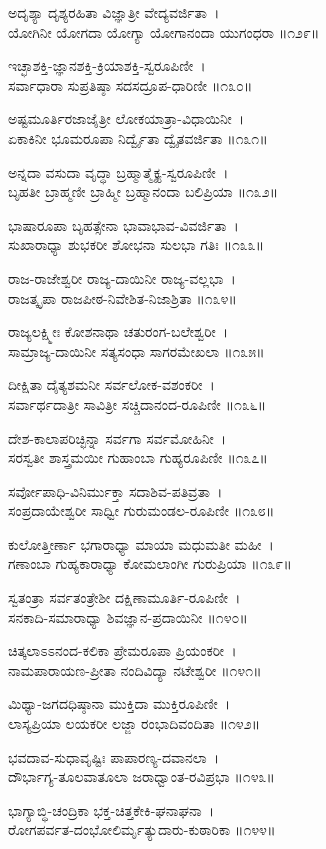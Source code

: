 ಅದೃಶ್ಯಾ ದೃಶ್ಯರಹಿತಾ ವಿಜ್ಞಾತ್ರೀ ವೇದ್ಯವರ್ಜಿತಾ~।\\
ಯೋಗಿನೀ ಯೋಗದಾ ಯೋಗ್ಯಾ ಯೋಗಾನಂದಾ ಯುಗಂಧರಾ ॥೧೨೯॥

ಇಚ್ಛಾಶಕ್ತಿ-ಜ್ಞಾನಶಕ್ತಿ-ಕ್ರಿಯಾಶಕ್ತಿ-ಸ್ವರೂಪಿಣೀ~।\\
ಸರ್ವಾಧಾರಾ ಸುಪ್ರತಿಷ್ಠಾ ಸದಸದ್ರೂಪ-ಧಾರಿಣೀ ॥೧೩೦॥

ಅಷ್ಟಮೂರ್ತಿರಜಾಜೈತ್ರೀ ಲೋಕಯಾತ್ರಾ-ವಿಧಾಯಿನೀ~।\\
ಏಕಾಕಿನೀ ಭೂಮರೂಪಾ ನಿರ್ದ್ವೈತಾ ದ್ವೈತವರ್ಜಿತಾ ॥೧೩೧॥

ಅನ್ನದಾ ವಸುದಾ ವೃದ್ಧಾ ಬ್ರಹ್ಮಾತ್ಮೈಕ್ಯ-ಸ್ವರೂಪಿಣೀ~।\\
ಬೃಹತೀ ಬ್ರಾಹ್ಮಣೀ ಬ್ರಾಹ್ಮೀ ಬ್ರಹ್ಮಾನಂದಾ ಬಲಿಪ್ರಿಯಾ ॥೧೩೨॥

ಭಾಷಾರೂಪಾ ಬೃಹತ್ಸೇನಾ ಭಾವಾಭಾವ-ವಿವರ್ಜಿತಾ~।\\
ಸುಖಾರಾಧ್ಯಾ ಶುಭಕರೀ ಶೋಭನಾ ಸುಲಭಾ ಗತಿಃ ॥೧೩೩॥

ರಾಜ-ರಾಜೇಶ್ವರೀ ರಾಜ್ಯ-ದಾಯಿನೀ ರಾಜ್ಯ-ವಲ್ಲಭಾ~।\\
ರಾಜತ್ಕೃಪಾ ರಾಜಪೀಠ-ನಿವೇಶಿತ-ನಿಜಾಶ್ರಿತಾ ॥೧೩೪॥

ರಾಜ್ಯಲಕ್ಷ್ಮೀಃ ಕೋಶನಾಥಾ ಚತುರಂಗ-ಬಲೇಶ್ವರೀ~।\\
ಸಾಮ್ರಾಜ್ಯ-ದಾಯಿನೀ ಸತ್ಯಸಂಧಾ ಸಾಗರಮೇಖಲಾ ॥೧೩೫॥

ದೀಕ್ಷಿತಾ ದೈತ್ಯಶಮನೀ ಸರ್ವಲೋಕ-ವಶಂಕರೀ~।\\
ಸರ್ವಾರ್ಥದಾತ್ರೀ ಸಾವಿತ್ರೀ ಸಚ್ಚಿದಾನಂದ-ರೂಪಿಣೀ  ॥೧೩೬॥

ದೇಶ-ಕಾಲಾಪರಿಚ್ಛಿನ್ನಾ ಸರ್ವಗಾ ಸರ್ವಮೋಹಿನೀ~।\\
ಸರಸ್ವತೀ ಶಾಸ್ತ್ರಮಯೀ ಗುಹಾಂಬಾ ಗುಹ್ಯರೂಪಿಣೀ ॥೧೩೭॥

ಸರ್ವೋಪಾಧಿ-ವಿನಿರ್ಮುಕ್ತಾ ಸದಾಶಿವ-ಪತಿವ್ರತಾ~।\\
ಸಂಪ್ರದಾಯೇಶ್ವರೀ ಸಾಧ್ವೀ ಗುರುಮಂಡಲ-ರೂಪಿಣೀ ॥೧೩೮॥

ಕುಲೋತ್ತೀರ್ಣಾ ಭಗಾರಾಧ್ಯಾ ಮಾಯಾ ಮಧುಮತೀ ಮಹೀ~।\\
ಗಣಾಂಬಾ ಗುಹ್ಯಕಾರಾಧ್ಯಾ ಕೋಮಲಾಂಗೀ ಗುರುಪ್ರಿಯಾ ॥೧೩೯॥

ಸ್ವತಂತ್ರಾ ಸರ್ವತಂತ್ರೇಶೀ ದಕ್ಷಿಣಾಮೂರ್ತಿ-ರೂಪಿಣೀ~।\\
ಸನಕಾದಿ-ಸಮಾರಾಧ್ಯಾ ಶಿವಜ್ಞಾನ-ಪ್ರದಾಯಿನೀ ॥೧೪೦॥

ಚಿತ್ಕಲಾಽಽನಂದ-ಕಲಿಕಾ ಪ್ರೇಮರೂಪಾ ಪ್ರಿಯಂಕರೀ~।\\
ನಾಮಪಾರಾಯಣ-ಪ್ರೀತಾ ನಂದಿವಿದ್ಯಾ ನಟೇಶ್ವರೀ ॥೧೪೧॥

ಮಿಥ್ಯಾ-ಜಗದಧಿಷ್ಠಾನಾ ಮುಕ್ತಿದಾ ಮುಕ್ತಿರೂಪಿಣೀ~।\\
ಲಾಸ್ಯಪ್ರಿಯಾ ಲಯಕರೀ ಲಜ್ಜಾ ರಂಭಾದಿವಂದಿತಾ ॥೧೪೨॥

ಭವದಾವ-ಸುಧಾವೃಷ್ಟಿಃ ಪಾಪಾರಣ್ಯ-ದವಾನಲಾ~।\\
ದೌರ್ಭಾಗ್ಯ-ತೂಲವಾತೂಲಾ ಜರಾಧ್ವಾಂತ-ರವಿಪ್ರಭಾ ॥೧೪೩॥

ಭಾಗ್ಯಾಬ್ಧಿ-ಚಂದ್ರಿಕಾ ಭಕ್ತ-ಚಿತ್ತಕೇಕಿ-ಘನಾಘನಾ~।\\
ರೋಗಪರ್ವತ-ದಂಭೋಲಿರ್ಮೃತ್ಯುದಾರು-ಕುಠಾರಿಕಾ ॥೧೪೪॥

